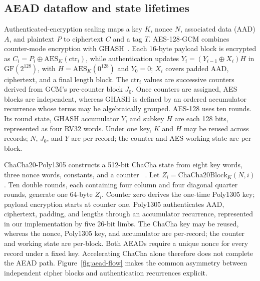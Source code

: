 \documentclass[conference]{IEEEtran}
\begin{document}
\subsection{AEAD dataflow and state lifetimes}
Authenticated-encryption sealing maps a key $K$, nonce $N$, associated data
(AAD) $A$, and plaintext $P$ to ciphertext $C$ and a tag $T$. AES-128-GCM combines
counter-mode encryption with GHASH~\cite{sp800-38d,mcgrew2004gcm}. Each
16-byte payload block is encrypted as
$C_i=P_i\oplus\mathrm{AES}_{K}(\mathrm{ctr}_i)$, while authentication updates
$Y_i=(Y_{i-1}\oplus X_i)H$ in $\mathrm{GF}(2^{128})$, with
$H=\mathrm{AES}_K(0^{128})$ and $Y_0=0$; $X_i$ covers padded AAD, ciphertext,
and a final length block. The $\mathrm{ctr}_i$ values are successive counters
derived from GCM's pre-counter block $J_0$. Once counters are assigned, AES
blocks are independent, whereas GHASH is defined by an ordered accumulator
recurrence whose terms may be algebraically grouped. AES-128 uses ten rounds.
Its round state, GHASH accumulator $Y$, and subkey $H$ are each 128 bits,
represented as four RV32 words. Under one key, $K$ and $H$ may be reused
across records; $N$, $J_0$, and $Y$ are per-record; the counter and AES
working state are per-block.

ChaCha20-Poly1305 constructs a 512-bit ChaCha state from eight key words,
three nonce words, constants, and a counter
~\cite{rfc8439,bernstein2008chacha,bernstein2005poly}. Let
$Z_i=\mathrm{ChaCha20Block}_K(N,i)$. Ten double rounds, each containing four
column and four diagonal quarter rounds, generate one 64-byte $Z_i$. Counter
zero derives the one-time Poly1305 key; payload encryption starts at counter
one. Poly1305 authenticates AAD, ciphertext, padding, and lengths through an
accumulator recurrence, represented in our implementation by five 26-bit
limbs. The ChaCha key may be reused, whereas the nonce, Poly1305 key, and
accumulator are per-record; the counter and working state are per-block. Both
AEADs require a unique nonce for every record under a fixed key. Accelerating
ChaCha alone therefore does not complete the AEAD path.
Figure~\ref{fig:aead-flow} makes the common asymmetry between independent
cipher blocks and authentication recurrences explicit.
\end{document}
